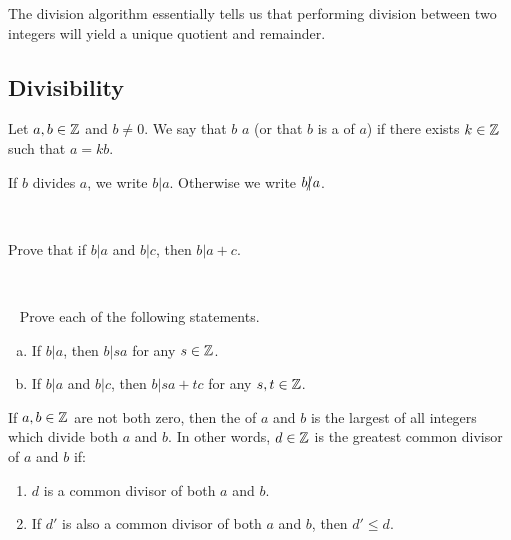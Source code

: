 \documentclass[11pt,fleqn,dvipsnames,usenames]{article}
\newcommand{\p}{\noindent}
\begin{document}
\p The division algorithm essentially tells us that performing division between two integers will yield a unique quotient and remainder.
\vsp

\subsection{Divisibility}

\begin{definition*} Let $a,b\in\mathbb{Z}$ and $b\neq 0$.  We say that $b$  $a$ (or that $b$ is a  of $a$) if there exists $k\in\mathbb{Z}$ such that $a = kb$.
\end{definition*}
\vsp

\notation If $b$ divides $a$, we write $b | a$.  Otherwise we write $b|\kern-0.9ex{/} a$.
\vsp

\begin{examples*}~
\vspace{2cm}

\end{examples*}
\newpage

\begin{example*}
Prove that if $b|a$ and $b|c$, then $b|a+c$.
\end{example*}
%
\begin{solution}~
\vspace{3cm}

\end{solution}
%
\begin{exercise*}~
Prove each of the following statements.
\begin{enumerate}[(a)]
\item If $b|a$, then $b|sa$ for any $s\in\mathbb{Z}$.
\item If $b|a$ and $b|c$, then $b|sa+tc$ for any $s,t\in\mathbb{Z}$.
\end{enumerate}
\end{exercise*}
%
\begin{definition*} If $a,b\in\mathbb{Z}$ are not both zero, then the  of $a$ and $b$ is the largest \nolinebreak of all integers which divide both $a$ and $b$.  In other words, $d\in\mathbb{Z}$ is the greatest common divisor of $a$ and \nolinebreak $b$ \nolinebreak if:
\begin{enumerate}[(1)]
\item $d$ is a common divisor of both $a$ and $b$.
\item If $d'$ is also a common divisor of both $a$ and $b$, then $d'\leq d$.
\end{enumerate}
\end{definition*}
\vsp
\end{document}
